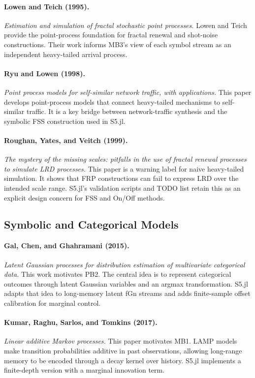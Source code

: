 \paragraph{Lowen and Teich (1995).}
\emph{Estimation and simulation of fractal stochastic point processes.}
Lowen and Teich provide the point-process foundation for fractal renewal and
shot-noise constructions. Their work informs MB3's view of each symbol stream as
an independent heavy-tailed arrival process.

\paragraph{Ryu and Lowen (1998).}
\emph{Point process models for self-similar network traffic, with applications.}
This paper develops point-process models that connect heavy-tailed mechanisms to
self-similar traffic. It is a key bridge between network-traffic synthesis and
the symbolic FSS construction used in S5.jl.

\paragraph{Roughan, Yates, and Veitch (1999).}
\emph{The mystery of the missing scales: pitfalls in the use of fractal renewal
processes to simulate LRD processes.}
This paper is a warning label for naive heavy-tailed simulation. It shows that
FRP constructions can fail to express LRD over the intended scale range. S5.jl's
validation scripts and TODO list retain this as an explicit design concern for
FSS and On/Off methods.

\subsection{Symbolic and Categorical Models}

\paragraph{Gal, Chen, and Ghahramani (2015).}
\emph{Latent Gaussian processes for distribution estimation of multivariate
categorical data.}
This work motivates PB2. The central idea is to represent categorical outcomes
through latent Gaussian variables and an argmax transformation. S5.jl adapts that
idea to long-memory latent fGn streams and adds finite-sample offset calibration
for marginal control.

\paragraph{Kumar, Raghu, Sarlos, and Tomkins (2017).}
\emph{Linear additive Markov processes.}
This paper motivates MB1. LAMP models make transition probabilities additive in
past observations, allowing long-range memory to be encoded through a decay
kernel over history. S5.jl implements a finite-depth version with a marginal
innovation term.

